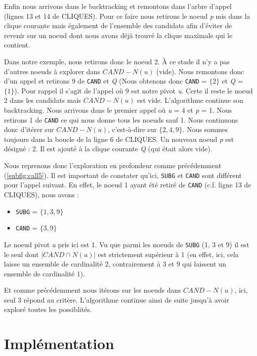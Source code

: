 \documentclass[12pt,a4paper]{article}
\begin{document}
Enfin nous arrivons dans le backtracking et remontons dans l'arbre d'appel (lignes 13 et 14 de CLIQUES). Pour ce faire nous retirons le noeud \emph{p} mis dans la clique courante mais également de l'ensemble des candidats afin d'éviter de revenir sur un noeud dont nous avons déjà trouvé la clique maximale qui le contient.

Dans notre exemple, nous retirons donc le noeud 2. À ce stade il n'y a pas d'autres noeuds à explorer dans \(CAND - N(u)\) (vide). Nous remontons donc d'un appel et retirons 9 de \texttt{CAND} et \emph{Q} (Nous obtenons donc \texttt{CAND} = \(\{2\}\) et \emph{Q} = \(\{1\}\)). Pour rappel il s'agit de l'appel où 9 est notre pivot \emph{u}. Certe il reste le noeud 2 dans les candidats mais \(CAND - N(u)\) est vide.
L'algorithme continue son backtracking. Nous arrivons dans le premier appel où \emph{u} = 4 et \emph{p} = 1. Nous retirons 1 de \texttt{CAND} ce qui nous donne tous les noeuds sauf 1. Nous continuons donc d'itérer sur \(CAND - N(u)\), c'est-à-dire sur \(\{2, 4, 9\}\). Nous sommes toujours dans la boucle de la ligne 6 de CLIQUES. Un nouveau noeud \emph{p} est désigné : 2. Il est ajouté à la clique courante \emph{Q} (qui était alors vide).

Nous reprenons donc l'exploration en profondeur comme précédemment (\ref{subfig:call5}). Il est important de constater qu'ici, \texttt{SUBG} et \texttt{CAND} sont différent pour l'appel suivant. En effet, le noeud 1 ayant été retiré de \texttt{CAND} (c.f. ligne 13 de CLIQUES), nous avons :

\begin{itemize}
  \item \texttt{SUBG} = \(\{1, 3, 9\}\)
  \item \texttt{CAND} = \(\{3, 9\}\)
\end{itemize}
Le noeud pivot \emph{u} pris ici est 1. Vu que parmi les noeuds de \texttt{SUBG} (1, 3 et 9) il est le seul dont \(|CAND \cap N(u)|\) est strictement supérieur à 1 (en effet, ici, cela laisse un ensemble de cardinalité 2, contrairement à 3 et 9 qui laissent un ensemble de cardinalité 1).

Et comme précédemment nous itérons sur les noeuds dans \(CAND - N(u)\), ici, seul 3 répond au critère. L'algorithme continue ainsi de suite jusqu'à avoir exploré toutes les possiblités.


\section{Implémentation}%
\label{sec:impl}
\end{document}
